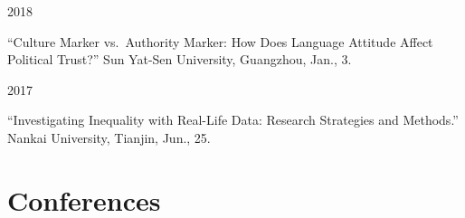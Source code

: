 \documentclass[10.5pt,]{article}
\providecommand{\tightlist}{%
	\setlength{\itemsep}{0pt}\setlength{\parskip}{0pt}}
\renewenvironment{itemize}{
	\begin{list}{}{
			\setlength{\leftmargin}{1.5em}
		}
	}{
	\end{list}
}
\begin{document}
\begin{itemize}
\tightlist
\item
  2018

  \begin{itemize}
  \tightlist
  \item
    ``Culture Marker vs.~Authority Marker: How Does Language Attitude
    Affect Political Trust?'' Sun Yat-Sen University, Guangzhou, Jan.,
    3.
  \end{itemize}
\item
  2017

  \begin{itemize}
  \tightlist
  \item
    ``Investigating Inequality with Real-Life Data: Research Strategies
    and Methods.'' Nankai University, Tianjin, Jun., 25.
  \end{itemize}
\end{itemize}

\hypertarget{conferences}{%
\section{Conferences}\label{conferences}}
\end{document}
